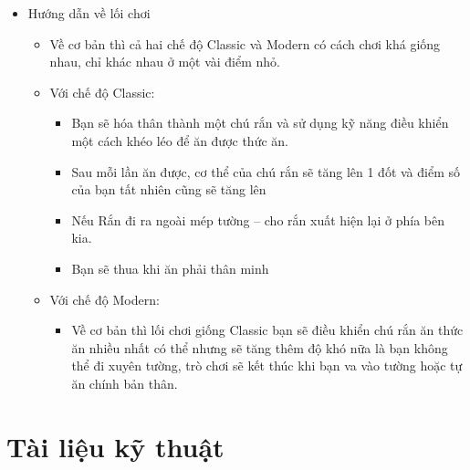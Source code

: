\documentclass[13pt,a4paper]{article}
\begin{document}
\begin{itemize}
\item Hướng dẫn về lối chơi
\begin{itemize}
     \item Về cơ bản thì cả hai chế độ Classic và Modern có cách chơi khá giống nhau, chỉ khác nhau ở một vài điểm nhỏ.
\item Với chế độ Classic:
\begin{itemize}
    \item Bạn sẽ hóa thân thành một chú rắn và sử dụng kỹ năng điều khiển một cách khéo léo để ăn được thức ăn.
	\item Sau mỗi lần ăn được, cơ thể của chú rắn sẽ tăng lên 1 đốt và điểm số của bạn tất nhiên cũng sẽ tăng lên
    \item Nếu Rắn đi ra ngoài mép tường – cho rắn xuất hiện lại ở phía bên kia.
    \item Bạn sẽ thua khi ăn phải thân minh 
\end{itemize}
	\item Với chế độ Modern:
    \begin{itemize}
    \item Về cơ bản thì lối chơi giống Classic bạn sẽ điều khiển chú rắn ăn thức ăn nhiều nhất có thể  nhưng sẽ tăng thêm độ khó nữa là bạn không thể đi xuyên tường, trò chơi sẽ kết thúc khi bạn va vào tường hoặc tự ăn chính bản thân.
\end{itemize}
    
\end{itemize}
\end{itemize}

\section{Tài liệu kỹ thuật}
\end{document}
